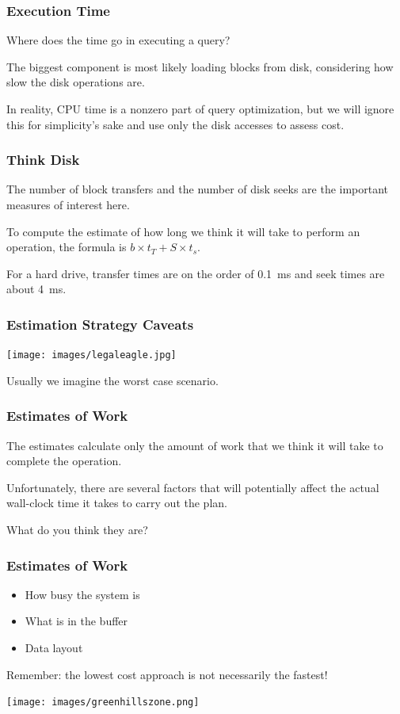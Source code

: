\begin{frame}
\frametitle{Execution Time}

Where does the time go in executing a query? 

The biggest component is most likely loading blocks from disk, considering how slow the disk operations are. 

In reality, CPU time is a nonzero part of query optimization, but we will ignore this for simplicity's sake and use only the disk accesses to assess cost.

\end{frame}

\begin{frame}
\frametitle{Think Disk}

The number of block transfers and the number of disk seeks are the important measures of interest here.
 
To compute the estimate of how long we think it will take to perform an operation, the formula is $b \times t_{T} + S \times t_{s}$. 

For a hard drive, transfer times are on the order of 0.1~ms and seek times are about 4~ms.

\end{frame}

\begin{frame}
\frametitle{Estimation Strategy Caveats}

\begin{center}
	\texttt{[image: images/legaleagle.jpg]}
\end{center}

Usually we imagine the worst case scenario.

\end{frame}



\begin{frame}
\frametitle{Estimates of Work}

The estimates calculate only the amount of work that we think it will take to complete the operation. 

Unfortunately, there are several factors that will potentially affect the actual wall-clock time it takes to carry out the plan. 

What do you think they are?


\end{frame}



\begin{frame}
\frametitle{Estimates of Work}

\begin{itemize}
	\item How busy the system is
	\item What is in the buffer
	\item Data layout
\end{itemize}


Remember: the lowest cost approach is not necessarily the fastest!

\begin{center}
	\texttt{[image: images/greenhillszone.png]}
\end{center}

\end{frame}


